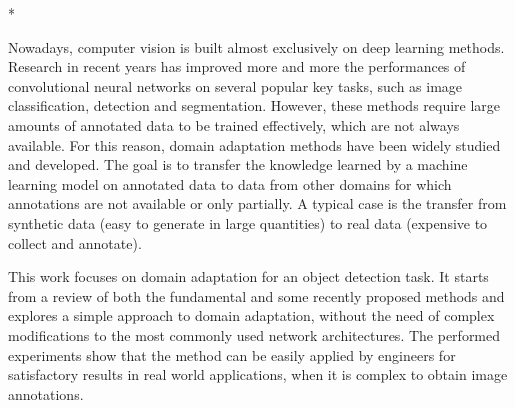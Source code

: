 \documentclass[%
    corpo=12pt,
    twoside,
    stile=classica,   
    tipotesi=magistrale,
    evenboxes,
    english,
	numerazioneromana,
]{toptesi}
\begin{document}
\english

\begin{ThesisTitlePage}*
% 
\def\Candidato{Candidate}

\end{ThesisTitlePage}


\sommario
Nowadays, computer vision is built almost exclusively on deep learning methods. Research in recent years has improved more and more the performances of convolutional neural networks on several popular key tasks, such as image classification, detection and segmentation. However, these methods require large amounts of annotated data to be trained effectively, which are not always available.
For this reason, domain adaptation methods have been widely studied and developed. The goal is to transfer the knowledge learned by a machine learning model on annotated data to data from other domains for which annotations are not available or only partially. A typical case is the transfer from synthetic data (easy to generate in large quantities) to real data (expensive to collect and annotate).

This work focuses on domain adaptation for an object detection task. It starts from a review of both the fundamental and some recently proposed methods and explores a simple approach to domain adaptation, without the need of complex modifications to the most commonly used network architectures. The performed experiments show that the method can be easily applied by engineers for satisfactory results in real world applications, when it is complex to obtain image annotations.
\end{document}

